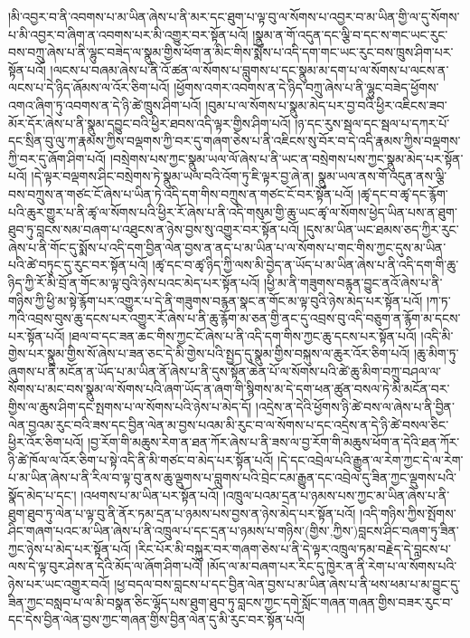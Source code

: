 །མི་འབྱར་བ་ནི་འབགས་པ་མ་ཡིན་ཞེས་པ་ནི་མར་དང་ཐུག་པ་ལྟ་བུ་ལ་སོགས་པ་འབྱར་བ་མ་ཡིན་གྱི་ལ་དུ་སོགས་པ་མི་འབྱར་བ་ཞིག་ན་འབགས་པར་མི་འགྱུར་བར་སྟོན་པའོ། །སྣུམ་ན་གོ་འདུན་དང་ལྕི་བ་དང་ས་གང་ཡང་རུང་བས་བཀྲུ་ཞེས་པ་ནི་ལྷུང་བཟེད་ལ་སྣུམ་གྱིས་ཕོག་ན་མིང་གིས་སྨོས་པ་འདི་དག་གང་ཡང་རུང་བས་ཁྲུས་ཤིག་པར་སྟོན་པའོ། །ལངས་པ་བཞམ་ཞེས་པ་ནི་འོ་ཚན་ལ་སོགས་པ་བླུགས་པ་དང་སྣུམ་མ་དག་པ་ལ་སོགས་པ་ལངས་ན་ལངས་པ་དེ་ཉིད་ཞོམས་ལ་འོར་ཅིག་པའོ། །ཕྱོགས་འགར་འབགས་ན་དེ་ཉིད་བཀྲུ་ཞེས་པ་ནི་ལྷུང་བཟེད་ཕྱོགས་འགའ་ཞིག་ཏུ་འབགས་ན་དེ་ཉི་ཚེ་ཁྲུས་ཤིག་པའོ། །བུམ་པ་ལ་སོགས་པ་སྣུམ་མེད་པར་བྱ་བའི་ཕྱིར་འཇིངས་ཟབ་མོར་དོར་ཞེས་པ་ནི་སྣུམ་དབྱུང་བའི་ཕྱིར་ཐབས་འདི་ལྟར་གྱིས་ཤིག་པའོ། །ཉ་དང་རུས་སྦལ་དང་སྦལ་པ་དཀར་པོ་དང་སྲིན་བུ་ལུ་ཀ་རྣམས་ཀྱིས་བལྡགས་ཀྱི་བར་དུ་གཞག་ཅེས་པ་ནི་འཇིངས་སུ་བོར་བ་དེ་འདི་རྣམས་ཀྱིས་བལྡགས་ཀྱི་བར་དུ་ཞོག་ཤིག་པའོ། །བསྲེགས་པས་ཀྱང་སྣུམ་ཡལ་ལོ་ཞེས་པ་ནི་ཡང་ན་བསྲེགས་པས་ཀྱང་སྣུམ་མེད་པར་སྟོན་པའོ། །དེ་ལྟར་བལྡགས་ཤིང་བསྲེགས་ཏེ་སྣུམ་ཡལ་བའི་འོག་ཏུ་ཇི་ལྟར་བྱ་ཞེ་ན། སྣུམ་ཡལ་ནས་གོ་འདུན་ནས་ལྕི་བས་བཀྲུས་ན་གཙང་ངོ་ཞེས་པ་ཡིན་ཏེ་འདི་དག་གིས་བཀྲུས་ན་གཙང་ངོ་བར་སྟོན་པའོ། །ཚྭ་དང་བ་ཚྭ་དང་རྙོག་པའི་ཆུར་གྱུར་པ་ནི་ཚྭ་ལ་སོགས་པའི་ཕྱིར་རོ་ཞེས་པ་ནི་འདི་གསུམ་གྱི་ཆུ་ཡང་ཚྭ་ལ་སོགས་ཕྱེད་ཡིན་པས་ན་ཐུག་ཐུབ་ཏུ་བླངས་སམ་བཞག་པ་འཐུངས་ན་ཉེས་བྱས་སུ་འགྱུར་བར་སྟོན་པའོ། །དུས་མ་ཡིན་ཡང་ཐམས་ཅད་ཀྱིར་རུང་ཞེས་པ་ནི་གོང་དུ་སྨོས་པ་འདི་དག་བྱིན་ལེན་བྱས་ན་ནད་པ་མ་ཡིན་པ་ལ་སོགས་པ་གང་གིས་ཀྱང་དུས་མ་ཡིན་པའི་ཚེ་བཏུང་དུ་རུང་བར་སྟོན་པའོ། །ཚྭ་དང་བ་ཚྭ་ཉིད་ཀྱི་ལས་མི་བྱེད་ན་ཡོད་པ་མ་ཡིན་ཞེས་པ་ནི་འདི་དག་གི་ཆུ་ཉིད་ཀྱི་རོ་མི་བྲོ་ན་གོང་མ་ལྟ་བུའི་ཉེས་པའང་མེད་པར་སྟོན་པའོ། །ཕྱི་མ་ནི་གཟུགས་བརྙན་བྱུང་ནའོ་ཞེས་པ་ནི་གཉིས་ཀྱི་ཕྱི་མ་སྟེ་རྙོག་པར་འགྱུར་པ་དེ་ནི་གཟུགས་བརྙན་སྣང་ན་གོང་མ་ལྟ་བུའི་ཉེས་མེད་པར་སྟོན་པའོ། །ཀ་ཏ་ཀའི་འབྲས་བུས་ཆུ་དངས་པར་འགྱུར་རོ་ཞེས་པ་ནི་ཆུ་རྙོག་མ་ཅན་གྱི་ནང་དུ་འབྲས་བུ་འདི་བཅུག་ན་རྙོག་མ་དངས་པར་སྟོན་པའོ། །ཐལ་བ་དང་ཟན་ཆང་གིས་ཀྱང་ངོ་ཞེས་པ་ནི་འདི་དག་གིས་ཀྱང་ཆུ་དངས་པར་སྟོན་པའོ། །འདི་མི་གྱེས་པར་སྣུམ་གྱིས་སོ་ཞེས་པ་ཟན་ཅང་དེ་མི་གྱེས་པའི་སྤྱད་དུ་སྣུམ་གྱིས་བསྐུས་ལ་ཆུར་འོར་ཅིག་པའོ། །ཆུ་མིག་ཏུ་ཞུགས་པ་ནི་མངོན་ན་ཡོད་པ་མ་ཡིན་ནོ་ཞེས་པ་ནི་དུས་སྟོན་ཆེན་པོ་ལ་སོགས་པའི་ཚེ་ཆུ་མིག་བཀྲུ་བཤལ་ལ་སོགས་པ་མང་བས་སྣུམ་ལ་སོགས་པའི་ཞག་ཡོད་ན་ཞག་གི་སྙིགས་མ་དེ་དག་ཕན་ཚུན་བསལ་ཏེ་མི་མངོན་བར་གྱིས་ལ་ཆུས་ཤིག་དང་སྤགས་པ་ལ་སོགས་པའི་ཉེས་པ་མེད་དོ། །འདྲེས་ན་དེའི་ཕྱོགས་ཉི་ཚེ་བས་ལ་ཞེས་པ་ནི་བྱིན་ལེན་བྱའམ་རུང་བའི་ཟས་དང་བྱིན་ལེན་མ་བྱས་པའམ་མི་རུང་བ་ལ་སོགས་པ་དང་འདྲེས་ན་དེ་ཉི་ཚེ་བསལ་ཅིང་ཕྱིར་འོར་ཅིག་པའོ། །བྱ་རོག་གི་མཆུས་རེག་ན་ཐན་ཀོར་ཞེས་པ་ནི་ཟས་ལ་བྱ་རོག་གི་མཆུས་ཕོག་ན་དེའི་ཐན་ཀོར་ཉི་ཚེ་ཁོལ་ལ་འོར་ཅིག་པ་སྟེ་འདི་ནི་མི་གཙང་བ་མེད་པར་སྟོན་པའོ། །དེ་དང་འབྲེལ་པའི་རྒྱུན་ལ་རེག་ཀྱང་དེ་ལ་རེག་པ་མ་ཡིན་ཞེས་པ་ནི་རིལ་བ་ལྟ་བུ་ནས་ཆུ་ལྡུགས་པ་བླུགས་པའི་བྲེང་ངམ་རྒྱུན་དང་འབྲེལ་དུ་ཟིན་ཀྱང་ལྡུགས་པའི་སྣོད་མེད་པ་དང་། །འཕགས་པ་མ་ཡིན་པར་སྟོན་པའོ། །འཁྲུལ་པའམ་དྲན་པ་ཉམས་པས་ཀྱང་མ་ཡིན་ཞེས་པ་ནི་ཐུག་ཐུབ་ཏུ་ལེན་པ་ལྟ་བུ་ནི་ནོར་ཏམ་དྲན་པ་ཉམས་པས་བྱས་ན་ཉེས་མེད་པར་སྟོན་པའོ། །འདི་གཉིས་ཀྱིས་སྤོགས་ཤིང་གཞག་པའང་མ་ཡིན་ཞེས་པ་ནི་འཁྲུལ་པ་དང་དྲན་པ་ཉམས་པ་གཉིས་(གྱིས་‚ཀྱིས་)བླངས་ཤིང་བཞག་ཏུ་ཟིན་ཀྱང་ཉེས་པ་མེད་པར་སྟོན་པའོ། །རིང་པོར་མི་བསྐུར་བར་གཞག་ཅེས་པ་ནི་དེ་ལྟར་འཁྲུལ་ཏམ་བརྗེད་དེ་བླངས་པ་ལས་དེ་ལྟ་བུར་ཤེས་ན་དེའི་མོད་ལ་ཞོག་ཤིག་པའོ། །མོད་ལ་མ་བཞག་པར་རིང་དུ་ཁྱེར་ན་ནི་རེག་པ་ལ་སོགས་པའི་ཉེས་པར་ཡང་འགྱུར་བའོ། །ཕྱ་བདལ་བས་བླངས་པ་དང་བྱིན་ལེན་བྱས་པ་མ་ཡིན་ཞེས་པ་ནི་ཕས་ཕམ་པ་མ་བྱུང་དུ་ཟིན་ཀྱང་བསླབ་པ་ལ་མི་བསྣན་ཅིང་ལྷོད་པས་ཐུག་ཐུབ་ཏུ་བླངས་ཀྱང་དགེ་སློང་གཞན་གཞན་གྱིས་བཟར་རུང་བ་དང་དེས་བྱིན་ལེན་བྱས་ཀྱང་གཞན་གྱིས་བྱིན་ལེན་དུ་མི་རུང་བར་སྟོན་པའོ། 